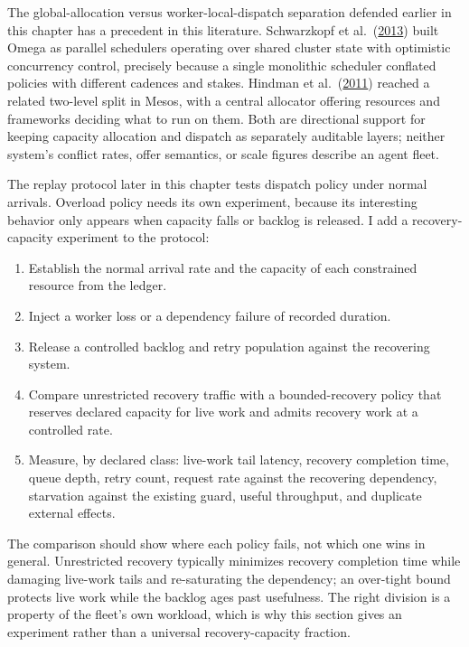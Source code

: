 The global-allocation versus worker-local-dispatch separation defended earlier in this chapter has a precedent in this literature. Schwarzkopf et al.~(\href{https://research.google/pubs/omega-flexible-scalable-schedulers-for-large-compute-clusters/}{2013}) built Omega as parallel schedulers operating over shared cluster state with optimistic concurrency control, precisely because a single monolithic scheduler conflated policies with different cadences and stakes. Hindman et al.~(\href{https://www.usenix.org/conference/nsdi11/mesos-platform-fine-grained-resource-sharing-data-center}{2011}) reached a related two-level split in Mesos, with a central allocator offering resources and frameworks deciding what to run on them. Both are directional support for keeping capacity allocation and dispatch as separately auditable layers; neither system's conflict rates, offer semantics, or scale figures describe an agent fleet.


The replay protocol later in this chapter tests dispatch policy under normal arrivals. Overload policy needs its own experiment, because its interesting behavior only appears when capacity falls or backlog is released. I add a recovery-capacity experiment to the protocol:

\begin{enumerate}
\def\labelenumi{\arabic{enumi}.}
\tightlist
\item
  Establish the normal arrival rate and the capacity of each constrained resource from the ledger.
\item
  Inject a worker loss or a dependency failure of recorded duration.
\item
  Release a controlled backlog and retry population against the recovering system.
\item
  Compare unrestricted recovery traffic with a bounded-recovery policy that reserves declared capacity for live work and admits recovery work at a controlled rate.
\item
  Measure, by declared class: live-work tail latency, recovery completion time, queue depth, retry count, request rate against the recovering dependency, starvation against the existing guard, useful throughput, and duplicate external effects.
\end{enumerate}

The comparison should show where each policy fails, not which one wins in general. Unrestricted recovery typically minimizes recovery completion time while damaging live-work tails and re-saturating the dependency; an over-tight bound protects live work while the backlog ages past usefulness. The right division is a property of the fleet's own workload, which is why this section gives an experiment rather than a universal recovery-capacity fraction.

